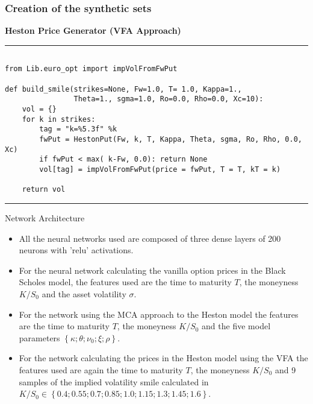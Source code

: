 \documentclass[11pt]{beamer}
\begin{document}
\begin{frame}[fragile]
\frametitle{Creation of the synthetic sets}
\textbf{Heston Price Generator (VFA Approach)}
\rule{\textwidth}{1pt}
\scriptsize
\begin{verbatim}

from Lib.euro_opt import impVolFromFwPut

def build_smile(strikes=None, Fw=1.0, T= 1.0, Kappa=1., 
                Theta=1., sgma=1.0, Ro=0.0, Rho=0.0, Xc=10):
    vol = {}
    for k in strikes:
        tag = "k=%5.3f" %k
        fwPut = HestonPut(Fw, k, T, Kappa, Theta, sgma, Ro, Rho, 0.0, Xc)
        if fwPut < max( k-Fw, 0.0): return None
        vol[tag] = impVolFromFwPut(price = fwPut, T = T, kT = k)

    return vol

\end{verbatim}
\rule{\textwidth}{1pt}
\end{frame}
\begin{frame}{Network Architecture}
	\begin{itemize}
		\item All the neural networks used are composed of three dense layers of 200
neurons with 'relu' activations. 
\item For the neural network calculating the
vanilla option prices in the Black Scholes model, the features used are
the time to maturity $T$, the moneyness $K/S_0$ and the asset volatility $\sigma$.
\item For the network using the MCA approach to the Heston model the features
are the time to maturity $T$, the moneyness $K/S_0$ and the five model parameters
$\left\{ \kappa; \theta; \nu_0; \xi; \rho \right\}$.
\item For the network calculating the prices in the Heston model using the
VFA the features used are again the time to maturity $T$, the moneyness
$K/S_0$ and 9 samples of the implied volatility smile calculated in $K/S_0 \in \left\{0.4; 0.55; 0.7; 0.85; 1.0; 1.15; 1.3; 1.45; 1.6 \right\}$.
\end{itemize}
\end{frame}
\end{document}
